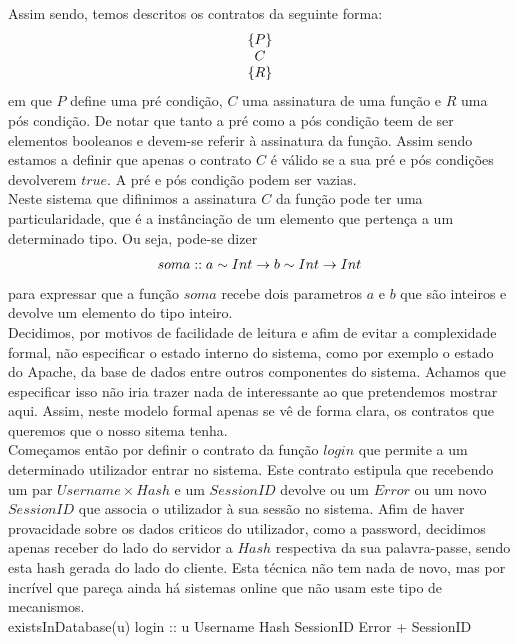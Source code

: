 Assim sendo, temos descritos os contratos da seguinte forma:
$$\noindent\begin{array}{c} \{P\} \\ C \\ \{R\} \\ \end{array}$$
em que $P$ define uma pré condição, $C$ uma assinatura de uma função e $R$ uma pós condição.
De notar que tanto a pré como a pós condição teem de ser elementos booleanos e devem-se referir à assinatura da função. Assim sendo estamos a definir que apenas o contrato $C$
é válido se a sua pré e pós condições devolverem $true$. A pré e pós condição podem ser vazias.\\

Neste sistema que difinimos a assinatura $C$ da função pode ter uma particularidade, que é a instânciação de um elemento que pertença a um determinado tipo.
Ou seja, pode-se dizer $$soma :: a \sim Int \rightarrow b \sim Int \rightarrow Int$$ para expressar que a função $soma$ recebe dois parametros $a$ e $b$ que são inteiros e devolve
um elemento do tipo inteiro.\\

Decidimos, por motivos de facilidade de leitura e afim de evitar a complexidade formal, não especificar o estado interno do sistema, como por exemplo o estado do Apache,
da base de dados entre outros componentes do sistema. Achamos que especificar isso não iria trazer nada de interessante ao que pretendemos mostrar aqui.
Assim, neste modelo formal apenas se vê de forma clara, os contratos que queremos que o nosso sitema tenha.\\

Começamos então por definir o contrato da função $login$ que permite a um determinado utilizador entrar no sistema. Este contrato estipula que recebendo um par
$Username \times Hash$ e um $SessionID$ devolve ou um $Error$ ou um novo $SessionID$ que associa o utilizador à sua sessão no sistema. Afim de haver provacidade
sobre os dados criticos do utilizador, como a password, decidimos apenas receber do lado do servidor a $Hash$ respectiva da sua palavra-passe, sendo esta hash
gerada do lado do cliente. Esta técnica não tem nada de novo, mas por incrível que pareça ainda há sistemas online que não usam este tipo de mecanismos.\\

\prop
{existsInDatabase(u)}
{login :: u \unif Username \times Hash \rarrow SessionID \rarrow Error + SessionID}
{ }

